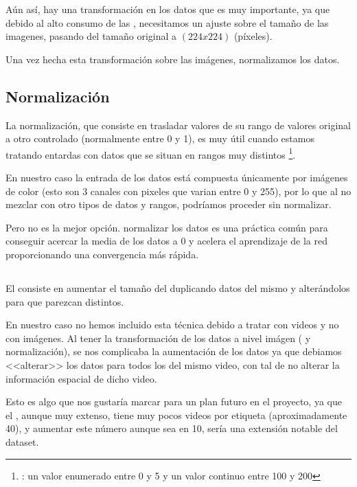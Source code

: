Aún así, hay una transformación en los datos que es muy importante, ya que debido al alto consumo de las , necesitamos un ajuste sobre el tamaño de las imagenes, pasando del tamaño original a $(224x224)$ (píxeles).

Una vez hecha esta transformación sobre las imágenes, normalizamos los datos.

\subsection{Normalización}

La normalización, que consiste en trasladar valores de su rango de valores original a otro controlado (normalmente entre 0 y 1), es muy útil cuando estamos tratando entardas con datos que se situan en rangos muy distintos \footnote{\pe: un valor enumerado entre 0 y 5 y un valor continuo entre 100 y 200}.

En nuestro caso la entrada de los datos está compuesta únicamente por imágenes de color (esto son 3 canales con pixeles que varian entre 0 y 255), por lo que al no mezclar con otro tipos de datos y rangos, podríamos proceder sin normalizar.

Pero no es la mejor opción. normalizar los datos es una práctica común para conseguir acercar la media de los datos a 0 y acelera el aprendizaje de la red proporcionando una convergencia más rápida.

\subsection{}

El  consiste en aumentar el tamaño del  duplicando datos del mismo y alterándolos para que parezcan distintos.

En nuestro caso no hemos incluido esta técnica debido a tratar con videos y no con imágenes. Al tener la transformación de los datos a nivel imágen ( y normalización), se nos complicaba la aumentación de los datos ya que debiamos <<alterar>> los datos para todos los  del mismo video, con tal de no alterar la información espacial de dicho video.

Esto es algo que nos gustaría marcar para un plan futuro en el proyecto, ya que el , aunque muy extenso, tiene muy pocos videos por etiqueta (aproximadamente 40), y aumentar este número aunque sea en 10, sería una extensión notable del dataset.

